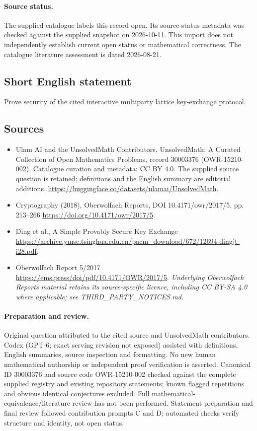 \documentclass[11pt]{article}
\begin{document}
\paragraph{Source status.}
The supplied catalogue labels this record open. Its source-status metadata was checked against the supplied snapshot on 2026-10-11. This import does not independently establish current open status or mathematical correctness. The catalogue literature assessment is dated 2026-08-21.
\subsection{Short English statement}
Prove security of the cited interactive multiparty lattice key-exchange protocol.
\subsection{Sources}
\begin{itemize}
\item[\hypertarget{source:30003376:1}{S1}] Ulam AI and the UnsolvedMath Contributors, UnsolvedMath: A Curated Collection of Open Mathematics Problems, record 30003376 (OWR-15210-002). Catalogue curation and metadata: CC BY 4.0. The supplied source question is retained; definitions and the English summary are editorial additions.
\url{https://huggingface.co/datasets/ulamai/UnsolvedMath}.
\item[\hypertarget{source:30003376:2}{S2}] Cryptography (2018), Oberwolfach Reports, DOI 10.4171/owr/2017/5, pp. 213--266
\url{https://doi.org/10.4171/owr/2017/5}.
\item[\hypertarget{source:30003376:3}{S3}] Ding et al., A Simple Provably Secure Key Exchange
\url{https://archive.ymsc.tsinghua.edu.cn/pacm_download/672/12694-dingjt-i28.pdf}.
\item[\hypertarget{source:30003376:4}{S4}] Oberwolfach Report 5/2017
\url{https://ems.press/doi/pdf/10.4171/OWR/2017/5}.
\textit{Underlying Oberwolfach Reports material retains its source-specific licence, including CC BY-SA 4.0 where applicable; see THIRD\_PARTY\_NOTICES.md.}
\end{itemize}
\paragraph{Preparation and review.}
Original question attributed to the cited source and UnsolvedMath contributors. Codex (GPT-6; exact serving revision not exposed) assisted with definitions, English summaries, source inspection and formatting. No new human mathematical authorship or independent proof verification is asserted. Canonical ID 30003376 and source code OWR-15210-002 checked against the complete supplied registry and existing repository statements; known flagged repetitions and obvious identical conjectures excluded. Full mathematical-equivalence/literature review has not been performed. Statement preparation and final review followed contribution prompts C and D; automated checks verify structure and identity, not open status.
\label{end:30003376}
\end{document}
